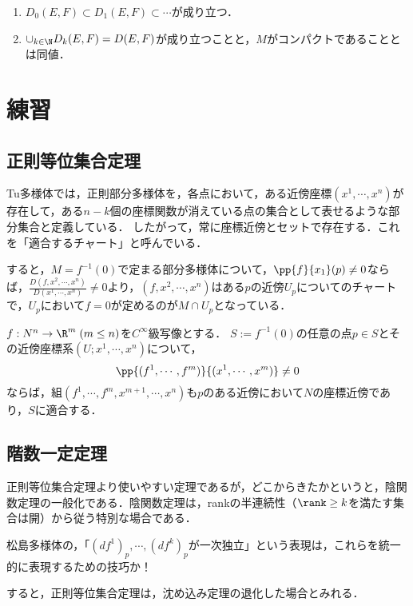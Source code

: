 \documentclass[uplatex,dvipdfmx]{jsreport}
\begin{document}
\begin{theorem}\mbox{}
    \begin{enumerate}
        \item $D_0(E,F)\subset D_1(E,F)\subset\cdots$が成り立つ．
        \item $\cup_{k\in\N}D_k(E,F)=D(E,F)$が成り立つことと，$M$がコンパクトであることとは同値．
    \end{enumerate}
\end{theorem}

\chapter{練習}

\section{正則等位集合定理}

\begin{tcolorbox}[colframe=ForestGreen, colback=ForestGreen!10!white,breakable,colbacktitle=ForestGreen!40!white,coltitle=black,fonttitle=\bfseries\sffamily,
title=]
    Tu多様体では，正則部分多様体を，各点において，ある近傍座標$(x^1,\cdots,x^n)$が存在して，ある$n-k$個の座標関数が消えている点の集合として表せるような部分集合と定義している．
    したがって，常に座標近傍とセットで存在する．これを「適合するチャート」と呼んでいる．

    すると，$M=f^{-1}(0)$で定まる部分多様体について，$\pp{f}{x_1}(p)\ne 0$ならば，$\frac{D(f,x^2,\cdots,x^n)}{D(x^1,\cdots,x^n)}\ne 0$より，$(f,x^2,\cdots,x^n)$はある$p$の近傍$U_p$についてのチャートで，$U_p$において$f=0$が定めるのが$M\cap U_p$となっている．
\end{tcolorbox}

\begin{lemma}[正則等位集合定理の証明抽出]
    $f:N^n\to\R^m\;(m\le n)$を$C^\infty$級写像とする．
    $S:=f^{-1}(0)$の任意の点$p\in S$とその近傍座標系$(U;x^1,\cdots,x^n)$について，
    \[\pp{(f^1,\cdots,f^m)}{(x^1,\cdots,x^m)}\ne 0\]
    ならば，組$(f^1,\cdots,f^m,x^{m+1},\cdots,x^n)$も$p$のある近傍において$N$の座標近傍であり，$S$に適合する．
\end{lemma}

\section{階数一定定理}

\begin{tcolorbox}[colframe=ForestGreen, colback=ForestGreen!10!white,breakable,colbacktitle=ForestGreen!40!white,coltitle=black,fonttitle=\bfseries\sffamily,
title=]
    正則等位集合定理より使いやすい定理であるが，どこからきたかというと，陰関数定理の一般化である．陰関数定理は，rankの半連続性（$\rank\ge k$を満たす集合は開）から従う特別な場合である．

    松島多様体の，「$(df^1)_p,\cdots,(df^k)_p$が一次独立」という表現は，これらを統一的に表現するための技巧か！

    すると，正則等位集合定理は，沈め込み定理の退化した場合とみれる．
\end{tcolorbox}
\end{document}
